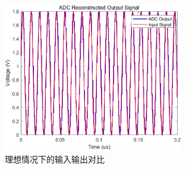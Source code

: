\documentclass[cs4size,a4paper]{ctexart}
\numberwithin{equation}{section}
\numberwithin{table}{section}
\numberwithin{figure}{section}
\begin{document}
		\begin{figure}[H]
			\centering
			\includegraphics[width=0.7\textwidth]{pic/ideal/inout.png}
			\caption{理想情况下的输入输出对比} 
		\end{figure}
\end{document}
